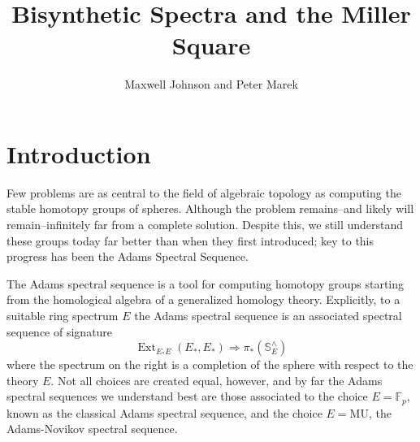 \documentclass[10pt]{amsart}
\theoremstyle{definition}
\numberwithin{figure}{section}
\numberwithin{equation}{section}
\newcommand{\MU}{\mathrm{MU}}
\newcommand{\Ext}{\operatorname{Ext}}
\theoremstyle{cited}
\newcommand{\bS}{\mathbb{S}}
\newcommand{\bF}{\mathbb{F}}
\newcommand{\Syn}{\mathcal{S}\mathrm{yn}}
\newcommand{\Comod}{\mathcal{C}\mathrm{omod}}
\begin{document}
\title{Bisynthetic Spectra and the Miller Square}
\author{Maxwell Johnson and Peter Marek}

\maketitle


\tableofcontents

\section{Introduction}

Few problems are as central to the field of algebraic topology as computing the stable homotopy groups of spheres. Although the problem remains--and likely will remain--infinitely far from a complete solution. Despite this, we still understand these groups today far better than when they first introduced; key to this progress has been the Adams Spectral Sequence. 

The Adams spectral sequence is a tool for computing homotopy groups starting from the homological algebra of a generalized homology theory. Explicitly, to a suitable ring spectrum $E$ the Adams spectral sequence is an associated spectral sequence of signature
\[
  \Ext_{E_*E}(E_*,E_*) \Rightarrow \pi_*(\bS^\wedge_E)
\]
where the spectrum on the right is a completion of the sphere with respect to the theory $E$. Not all choices are created equal, however, and by far the Adams spectral sequences we understand best are those associated to the choice $E=\bF_p$, known as the classical Adams spectral sequence, and the choice $E=\MU$, the Adams-Novikov spectral sequence. 
\end{document}
